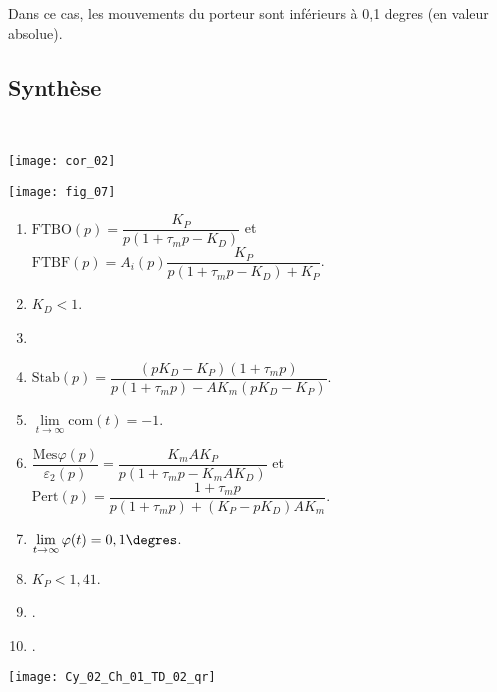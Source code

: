 \fi


\ifprof
\begin{corrige}
Dans ce cas, les mouvements du porteur sont inférieurs à 0,1 degres (en valeur absolue).
\end{corrige}
\else
\fi


\subsection*{Synthèse}
\ifprof
\begin{corrige}~\\
\begin{center}
\texttt{[image: cor\_02]}
\end{center}
\end{corrige}
\else
\begin{center}
\texttt{[image: fig\_07]}
\end{center}
\fi

\ifcolle
\else
\ifprof
\else
\begin{solution}
\begin{enumerate}
\item $\text{FTBO}(p)=\dfrac{ K_P}{p\left(1+\tau_m p-K_D \right)}$ et $\text{FTBF}(p)=A_i(p)\dfrac{K_P}{p\left(1+\tau_m p- K_D \right)+K_P}$.
\item $K_D < 1$.
\item 
\item $\text{Stab}(p)=\dfrac{\left(pK_D-K_P \right) \left(1+\tau_m p\right)}{p\left(1+\tau_m p \right) - AK_m \left( pK_D-K_P\right) }$.
\item $\lim\limits_{t\to\infty}\text{com}(t)=-1$.
\item $\dfrac{\text{Mes}\varphi(p)}{\varepsilon_2(p)} = \dfrac{K_m A K_P}{p\left(1+\tau_m p-K_m A K_D \right)}$  et $\text{Pert}(p)=\dfrac{1+\tau_m p}{p \left(1+\tau_m p\right)+\left(K_P-pK_D\right)AK_m}$.
\item $\lim\limits_{t\to\infty}\varphi(t) = 0,1\degres$.
\item $K_P < 1,41 $.
\item .
\item .
\end{enumerate}
\end{solution}%
\fi
\fi


\ifprof
\else
\begin{marginfigure}[-3cm]
\centering
\texttt{[image: Cy\_02\_Ch\_01\_TD\_02\_qr]}
\end{marginfigure}
\fi